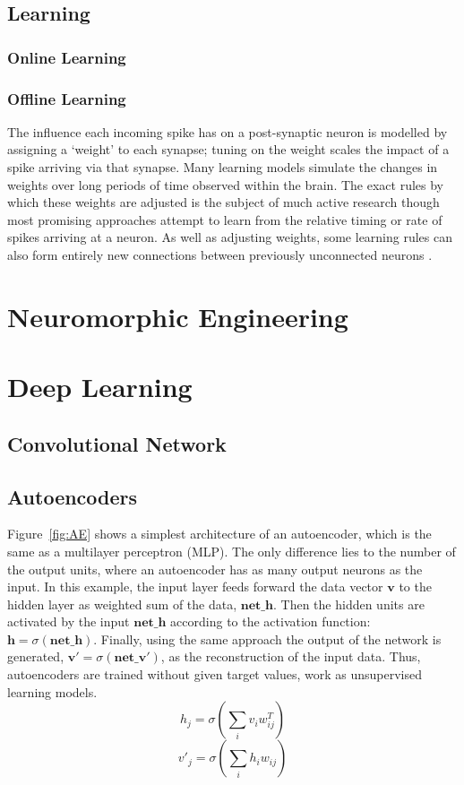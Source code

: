 \subsection{Learning}
\subsubsection{Online Learning}
\subsubsection{Offline Learning}
The influence each incoming spike has on a post-synaptic neuron is modelled by assigning a `weight' to each synapse;
tuning on the weight scales the impact of a spike
arriving via that synapse.
Many learning models simulate the changes in weights over long periods of time observed within the brain.
The exact rules by which these weights are adjusted is the subject of much active research though most promising approaches attempt to learn from the relative timing \cite{pfister2006triplets} or rate \cite{bienenstock1982theory} of spikes arriving at a neuron.
As well as adjusting weights, some learning rules can also form entirely new connections between previously unconnected
neurons \cite{bamford2010synaptic}.

\section{Neuromorphic Engineering}
\label{sec:morph}

\section{Deep Learning}
\subsection{Convolutional Network}
\subsection{Autoencoders}
\label{sec:AE}
Figure~\ref{fig:AE} shows a simplest architecture of an autoencoder, which is the same as a multilayer perceptron (MLP).
The only difference lies to the number of the output units, where an autoencoder has as many output neurons as the input.
In this example, the input layer feeds forward the data vector $\mathbf{v}$ to the hidden layer as weighted sum of the data, $\mathbf{net\_h}$.
Then the hidden units are activated by the input $\mathbf{net\_h}$ according to the activation function: $\mathbf{h}=\sigma(\mathbf{net\_h})$.
Finally, using the same approach the output of the network is generated, $\mathbf{v'}=\sigma(\mathbf{net\_v'})$, as the reconstruction of the input data.
Thus, autoencoders are trained without given target values, work as unsupervised learning models.
\begin{equation}
h_j=\sigma(\sum_i v_i w^T_{ij})
\end{equation}
\begin{equation}
v'_j=\sigma(\sum_i h_i w_{ij})
\end{equation}

